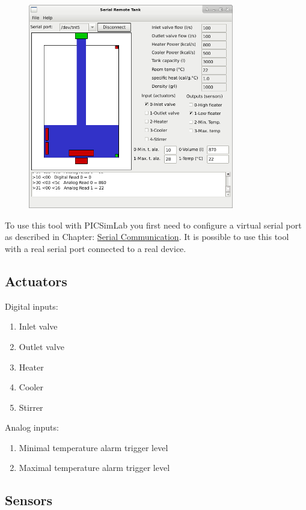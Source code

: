 \begin{figure}[H]
\center
\includegraphics[width=0.8\textwidth]{img/srtank.png} 
\end{figure} 


To use this tool with PICSimLab you first need to configure a virtual serial port as described in Chapter: \hyperlink{def:seriali}{Serial Communication}.
It is possible to use this tool with a real serial port connected to a real device. 

\subsection{Actuators}

Digital inputs:
\begin{enumerate}
\item Inlet valve
\item Outlet valve
\item Heater
\item Cooler
\item Stirrer
\end{enumerate}

Analog inputs:
\begin{enumerate}
\item Minimal temperature alarm trigger level
\item Maximal temperature alarm trigger level
\end{enumerate}

\subsection{Sensors}

